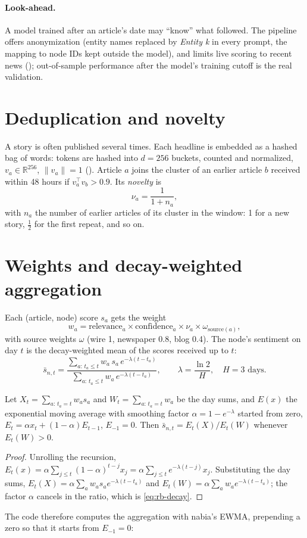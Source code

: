 \paragraph{Look-ahead.} A model trained after an article's date may ``know'' what followed. The pipeline offers
anonymization (entity names replaced by \emph{Entity k} in every prompt, the mapping to node IDs kept outside the
model), and limits live scoring to recent news (); out-of-sample performance after the model's
training cutoff is the real validation.

\section{Deduplication and novelty}
A story is often published several times. Each headline is embedded as a hashed bag of words: tokens are
hashed into $d=256$ buckets, counted and normalized, $v_a\in\mathbb R^{256}$, $\|v_a\|=1$ ().
Article $a$ joins the cluster of an earlier article $b$ received within 48 hours if $v_a^\top v_b>0.9$. Its
\emph{novelty} is
\[
  \nu_a=\frac1{1+n_a},
\]
with $n_a$ the number of earlier articles of its cluster in the window: 1 for a new story, $\tfrac12$ for the
first repeat, and so on.

\section{Weights and decay-weighted aggregation}
Each (article, node) score $s_a$ gets the weight
\[
  w_a=\text{relevance}_a\times\text{confidence}_a\times\nu_a\times\omega_{\text{source}(a)},
\]
with source weights $\omega$ (wire 1, newspaper 0.8, blog 0.4). The node's sentiment on day $t$ is the
decay-weighted mean of the scores received up to $t$:
\begin{equation}\label{eq:rb-decay}
  \bar s_{n,t}=\frac{\sum_{a:\,t_a\le t}w_a\,s_a\,e^{-\lambda(t-t_a)}}{\sum_{a:\,t_a\le t}w_a\,e^{-\lambda(t-t_a)}},
  \qquad \lambda=\frac{\ln 2}{H},\quad H=3\text{ days}.
\end{equation}
\begin{proposition}\label{prop:rb-ema}
Let $X_t=\sum_{a:\,t_a=t}w_as_a$ and $W_t=\sum_{a:\,t_a=t}w_a$ be the day sums, and $E(x)$ the exponential moving
average with smoothing factor $\alpha=1-e^{-\lambda}$ started from zero,
$E_t=\alpha x_t+(1-\alpha)E_{t-1}$, $E_{-1}=0$. Then $\bar s_{n,t}=E_t(X)/E_t(W)$ whenever $E_t(W)>0$.
\end{proposition}
\begin{proof}
Unrolling the recursion, $E_t(x)=\alpha\sum_{j\le t}(1-\alpha)^{t-j}x_j=\alpha\sum_{j\le t}e^{-\lambda(t-j)}x_j$.
Substituting the day sums, $E_t(X)=\alpha\sum_{a}w_as_ae^{-\lambda(t-t_a)}$ and
$E_t(W)=\alpha\sum_{a}w_ae^{-\lambda(t-t_a)}$; the factor $\alpha$ cancels in the ratio, which is
\eqref{eq:rb-decay}.
\end{proof}
The code therefore computes the aggregation with nabia's EWMA, prepending a zero so that it starts from $E_{-1}=0$:

